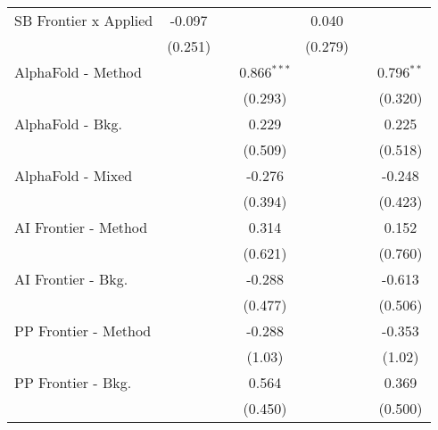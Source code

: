 \begin{tabular}{lcccccc}
   SB Frontier x Applied          & -0.097         &                &                & 0.040          &                &   \\   
                                  & (0.251)        &                &                & (0.279)        &                &   \\   
   AlphaFold - Method             &                &                & 0.866$^{***}$  &                &                & 0.796$^{**}$\\   
                                  &                &                & (0.293)        &                &                & (0.320)\\   
   AlphaFold - Bkg.               &                &                & 0.229          &                &                & 0.225\\   
                                  &                &                & (0.509)        &                &                & (0.518)\\   
   AlphaFold - Mixed              &                &                & -0.276         &                &                & -0.248\\   
                                  &                &                & (0.394)        &                &                & (0.423)\\   
   AI Frontier - Method           &                &                & 0.314          &                &                & 0.152\\   
                                  &                &                & (0.621)        &                &                & (0.760)\\   
   AI Frontier - Bkg.             &                &                & -0.288         &                &                & -0.613\\   
                                  &                &                & (0.477)        &                &                & (0.506)\\   
   PP Frontier - Method           &                &                & -0.288         &                &                & -0.353\\   
                                  &                &                & (1.03)         &                &                & (1.02)\\   
   PP Frontier - Bkg.             &                &                & 0.564          &                &                & 0.369\\   
                                  &                &                & (0.450)        &                &                & (0.500)\\   

\end{tabular}
